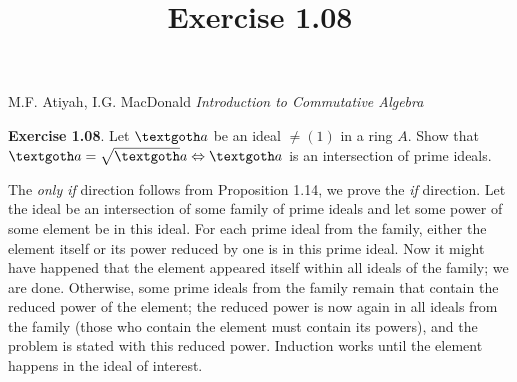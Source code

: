 \documentclass{article}
\title{Exercise 1.08}
\begin{document}
\maketitle

\begin{center}
M.F. Atiyah, I.G. MacDonald \emph{Introduction to Commutative Algebra}
\end{center}

\vspace*{10px} 

\textbf{Exercise 1.08}. Let $\textgoth a$ be an ideal $ \neq (1) $ in a ring $A$. Show that $ \textgoth a = \sqrt \textgoth a \Leftrightarrow \textgoth a $ is an intersection of prime ideals. 

\vspace*{10px} 

The \emph{only if} direction follows from Proposition 1.14, we prove the \emph{if} direction. Let the ideal be an intersection of some family of prime ideals and let some power of some element be in this ideal. For each prime ideal from the family, either the element itself or its power reduced by one is in this prime ideal. Now it might have happened that the element appeared itself within all ideals of the family; we are done. Otherwise, some prime ideals from the family remain that contain the reduced power of the element; the reduced power is now again in all ideals from the family (those who contain the element must contain its powers), and the problem is stated with this reduced power. Induction works until the element happens in the ideal of interest.
 
\end{document}

